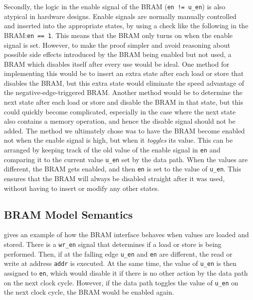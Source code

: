 Secondly, the logic in the enable signal of the \gls{BRAM} (\texttt{en != u\_en}) is
also atypical in hardware designs.  Enable signals are normally manually
controlled and inserted into the appropriate states, by using a check like the
following in the \gls{BRAM}:\@ \texttt{en == 1}.  This means that the \gls{BRAM} only turns on
when the enable signal is set.  However, to make the proof simpler and avoid
reasoning about possible side effects introduced by the \gls{BRAM} being enabled but
not used, a \gls{BRAM} which disables itself after every use would be ideal.  One
method for implementing this would be to insert an extra state after each load
or store that disables the \gls{BRAM}, but this extra state would eliminate the speed
advantage of the negative-edge-triggered \gls{BRAM}. Another method would be to
determine the next state after each load or store and disable the \gls{BRAM} in that
state, but this could quickly become complicated, especially in the case where
the next state also contains a memory operation, and hence the disable signal
should not be added. The method we ultimately chose was to have the \gls{BRAM} become
enabled not when the enable signal is high, but when it \emph{toggles} its
value.  This can be arranged by keeping track of the old value of the enable
signal in \texttt{en} and comparing it to the current value \texttt{u\_en} set
by the data path.  When the values are different, the \gls{BRAM} gets enabled, and then
\texttt{en} is set to the value of \texttt{u\_en}. This ensures that the \gls{BRAM}
will always be disabled straight after it was used, without having to insert or
modify any other states.


\subsection{BRAM Model Semantics}%
\label{sec:hg:bram-model-semantics}

 gives an example of how the \gls{BRAM} interface
behaves when values are loaded and stored.  There is a \texttt{wr\_en} signal
that determines if a load or store is being performed.  Then, if at the falling
edge \texttt{u\_en} and \texttt{en} are different, the read or write at address
\texttt{addr} is executed.  At the same time, the value of \texttt{u\_en} is
then assigned to \texttt{en}, which would disable it if there is no other action
by the data path on the next clock cycle.  However, if the data path toggles the
value of \texttt{u\_en} on the next clock cycle, the \gls{BRAM} would be enabled
again.

